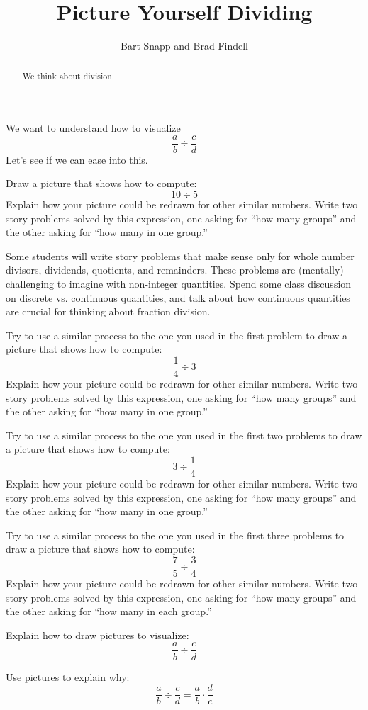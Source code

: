 \documentclass[nooutcomes]{ximera}
\title{Picture Yourself Dividing}
\author{Bart Snapp and Brad Findell}
\begin{document}
\begin{abstract}
We think about division.
\end{abstract}
\maketitle


We want to understand how to visualize 
\[
\frac{a}{b} \div \frac{c}{d}
\]
Let's see if we can ease into this.

\begin{problem}
Draw a picture that shows how to compute:
\[
10\div 5
\]
Explain how your picture could be redrawn for other similar
numbers. Write two story problems solved by this expression, one
asking for ``how many groups'' and the other asking for ``how many in
one group.''
\end{problem}

\begin{teachingnote}
Some students will write story problems that make sense only for whole number divisors, dividends, quotients, and remainders.  These problems are (mentally) challenging to imagine with non-integer quantities.  Spend some class discussion on discrete vs. continuous quantities, and talk about how continuous quantities are crucial for thinking about fraction division.  
\end{teachingnote}

\begin{problem}
Try to use a similar process to the one you used in the first problem
to draw a picture that shows how to compute:
\[
\frac{1}{4} \div 3
\]
Explain how your picture could be redrawn for other similar numbers.
Write two story problems solved by this expression, one asking for
``how many groups'' and the other asking for ``how many in one
group.''
\end{problem}


\begin{problem}
Try to use a similar process to the one you used in the first two problems
to draw a picture that shows how to compute:
\[
3 \div \frac{1}{4}
\]
Explain how your picture could be redrawn for other similar numbers.
Write two story problems solved by this expression, one asking for
``how many groups'' and the other asking for ``how many in one
group.''
\end{problem}


\begin{problem}
Try to use a similar process to the one you used in the first three problems
to draw a picture that shows how to compute:
\[
\frac{7}{5} \div \frac{3}{4}
\]
Explain how your picture could be redrawn for other similar numbers.
Write two story problems solved by this expression, one asking for
``how many groups'' and the other asking for ``how many in each
group.''
\end{problem}

\begin{problem}
Explain how to draw pictures to visualize:
\[
\frac{a}{b} \div \frac{c}{d}
\]
\end{problem}

\begin{problem}
Use pictures to explain why:
\[
\frac{a}{b} \div \frac{c}{d} = \frac{a}{b} \cdot \frac{d}{c}
\]
\end{problem}
\end{document}
